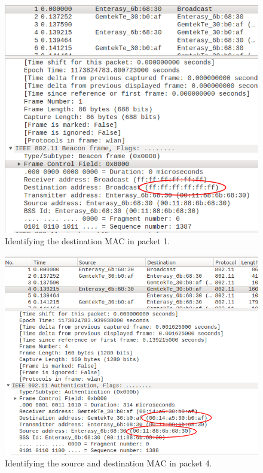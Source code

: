 \documentclass{article}
\begin{document}
\begin{figure}
\begin{mdframed}
\includegraphics[scale=0.5]{Step_1b.png}
\caption{Identifying the destination MAC in packet 1.}
\label{fig:step1b}
\end{mdframed}
\end{figure}

\begin{figure}
\begin{mdframed}
\includegraphics[scale=0.4]{Step_1c.png}
\caption{Identifying the source and destination MAC in packet 4.}
\label{fig:step1c}
\end{mdframed}
\end{figure}
\end{document}
